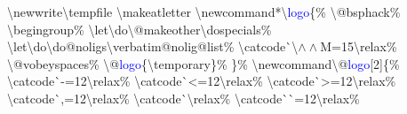 \resetlinenumber
\begin{linenumbers}\singlespacing\ttfamily
\textbackslash newwrite\textbackslash tempf{}ile\newline
\textbackslash makeatletter\newline
\textbackslash newcommand*\textbackslash \textcolor{blue}{logo}\{\%\newline
\hspace*{1.2em}\textbackslash @bsphack\%\newline
\hspace*{1.2em}\textbackslash begingroup\%\newline
\hspace*{1.2em}\textbackslash let\textbackslash do\textbackslash @makeother\textbackslash dospecials\%\newline
\hspace*{1.2em}\textbackslash let\textbackslash do\textbackslash do@noligs\textbackslash verbatim@nolig@list\%\newline
\hspace*{1.2em}\textbackslash catcode\`{}\textbackslash $\wedge\wedge$M=15\textbackslash relax\%\newline
\hspace*{1.2em}\textbackslash @vobeyspaces\%\newline
\hspace*{1.2em}\textbackslash @\textcolor{blue}{logo}\{\textbackslash temporary\}\%\newline
\}\%\newline
\textbackslash newcommand\textbackslash @\textcolor{blue}{logo}[2]\{\%\newline
\hspace*{1.2em}\textbackslash catcode\`{}-=12\textbackslash relax\%\newline
\hspace*{1.2em}\textbackslash catcode\`{}<=12\textbackslash relax\%\newline
\hspace*{1.2em}\textbackslash catcode\`{}>=12\textbackslash relax\%\newline
\hspace*{1.2em}\textbackslash catcode\`{},=12\textbackslash relax\%\newline
\hspace*{1.2em}\textbackslash catcode\`{}\textbackslash relax\%\newline
\hspace*{1.2em}\textbackslash catcode\`{}\`{}=12\textbackslash relax\%\newline

\end{linenumbers}
